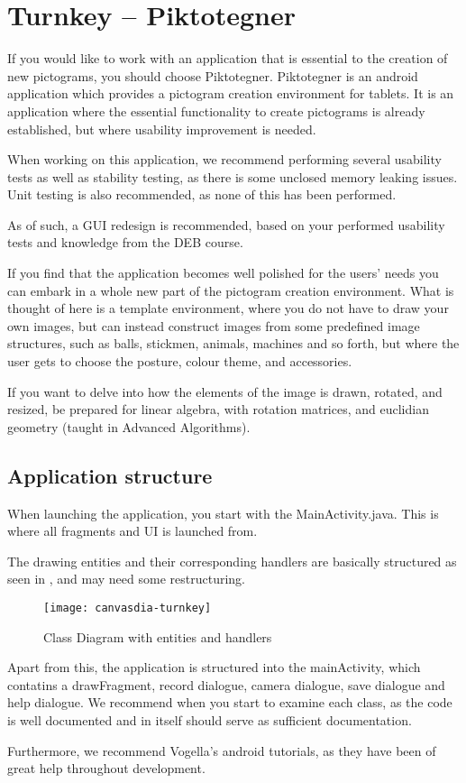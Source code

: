 \chapter{Turnkey -- Piktotegner}
If you would like to work with an application that is essential to the creation of new pictograms, you should choose Piktotegner.
Piktotegner is an android application which provides a pictogram creation environment for tablets.
It is an application where the essential functionality to create pictograms is already established, but where usability improvement is needed.

When working on this application, we recommend performing several usability tests as well as stability testing, as there is some unclosed memory leaking issues.
Unit testing is also recommended, as none of this has been performed.

As of such, a GUI redesign is recommended, based on your performed usability tests and knowledge from the DEB course.

If you find that the application becomes well polished for the users' needs you can embark in a whole new part of the pictogram creation environment.
What is thought of here is a template environment, where you do not have to draw your own images, but can instead construct images from some predefined image structures, such as balls, stickmen, animals, machines and so forth, but where the user gets to choose the posture, colour theme, and accessories.

If you want to delve into how the elements of the image is drawn, rotated, and resized, be prepared for linear algebra, with rotation matrices, and euclidian geometry (taught in Advanced Algorithms).

\section{Application structure}
When launching the application, you start with the MainActivity.java. 
This is where all fragments and UI is launched from.

The drawing entities and their corresponding handlers are basically structured as seen in , and may need some restructuring.

\begin{figure}[h]
     \centering
     \texttt{[image: canvasdia-turnkey]}
     \caption{Class Diagram with entities and handlers}
     \label{fig:turnkeydiacanvas}
\end{figure}

Apart from this, the application is structured into the mainActivity, which contatins a drawFragment, record dialogue, camera dialogue, save dialogue and help dialogue.
We recommend when you start to examine each class, as the code is well documented and in itself should serve as sufficient documentation.

Furthermore, we recommend Vogella's android tutorials, as they have been of great help throughout development.